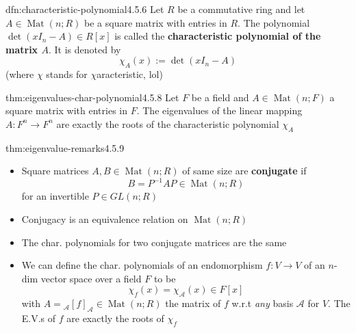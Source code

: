 \documentclass[landscape, 8pt]{extarticle}
\DeclareMathOperator{\Mat}{Mat}
\begin{document}
\begin{multicols}{3}
\begin{dfn}{dfn:characteristic-polynomial}{4.5.6}
    Let $R$ be a commutative ring and let $A\in \Mat(n;R)$ be a square matrix with entries in $R$. The polynomial $\det(x I_{n} - A)\in R[x]$ is called the \textbf{characteristic polynomial of the matrix $A$}. It is denoted by
    \[\chi_{A}(x) := \det(x I_{n} - A)\]
    (where $\chi$ stands for $\chi$aracteristic, lol)
\end{dfn}

\begin{thm}{thm:eigenvalues-char-polynomial}{4.5.8}
    Let $F$ be a field and $A\in \Mat(n;F)$ a square matrix with entries in $F$. The eigenvalues of the linear mapping $A : F^{n}\to F^{n}$ are exactly the roots of the characteristic polynomial $\chi_{A}$
\end{thm}

\newpage
\begin{thm}{thm:eigenvalue-remarks}{4.5.9}
    \begin{itemize}[leftmargin=*]
        \setlength\itemsep{0em}
        \item Square matrices $A, B\in \Mat(n;R)$ of same size are \textbf{conjugate} if
            \[B = P^{-1}AP\in \Mat(n; R)\]
            for an invertible $P\in GL(n;R)$
        \item Conjugacy is an equivalence relation on $\Mat(n;R)$
        \item The char. polynomials for two conjugate matrices are the same
        \item We can define the char. polynomials of an endomorphism $f : V\to V$ of an $n$-dim vector space over a field $F$ to be
            \[\chi_{f}(x) = \chi_{\mathcal{A}}(x)\in F[x]\]
            with $A = {}_{\mathcal{A}}[f]_{\mathcal{A}}\in \Mat(n;R)$ the matrix of $f$ w.r.t \textit{any} basis $\mathcal{A}$ for $V$. The E.V.s of $f$ are exactly the roots of $\chi_{f}$
    \end{itemize}
\end{thm}


\end{multicols}
\end{document}
